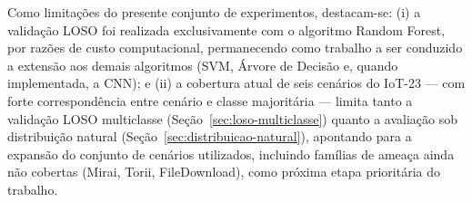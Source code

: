 Como limitações do presente conjunto de experimentos, destacam-se: (i) a validação LOSO foi realizada exclusivamente com o algoritmo Random Forest, por razões de custo computacional, permanecendo como trabalho a ser conduzido a extensão aos demais algoritmos (SVM, Árvore de Decisão e, quando implementada, a CNN); e (ii) a cobertura atual de seis cenários do IoT-23 — com forte correspondência entre cenário e classe majoritária — limita tanto a validação LOSO multiclasse (Seção~\ref{sec:loso-multiclasse}) quanto a avaliação sob distribuição natural (Seção~\ref{sec:distribuicao-natural}), apontando para a expansão do conjunto de cenários utilizados, incluindo famílias de ameaça ainda não cobertas (Mirai, Torii, FileDownload), como próxima etapa prioritária do trabalho.

%
%

